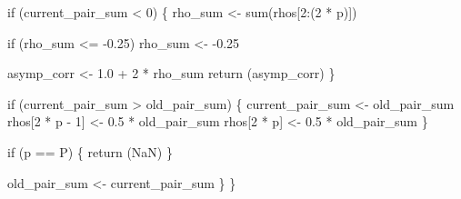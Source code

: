 \documentclass[
  letterpaper,
  DIV=11,
  numbers=noendperiod]{scrartcl}
\newenvironment{Shaded}{\begin{snugshade}}{\end{snugshade}}
\newcommand{\BuiltInTok}[1]{\textcolor[rgb]{0.00,0.23,0.31}{#1}}
\newcommand{\ControlFlowTok}[1]{\textcolor[rgb]{0.00,0.23,0.31}{#1}}
\newcommand{\DecValTok}[1]{\textcolor[rgb]{0.68,0.00,0.00}{#1}}
\newcommand{\FloatTok}[1]{\textcolor[rgb]{0.68,0.00,0.00}{#1}}
\newcommand{\NormalTok}[1]{\textcolor[rgb]{0.00,0.23,0.31}{#1}}
\newcommand{\OperatorTok}[1]{\textcolor[rgb]{0.37,0.37,0.37}{#1}}
\begin{document}
\begin{Shaded}
\begin{Highlighting}[]
    \ControlFlowTok{if}\NormalTok{ (current\_pair\_sum }\OperatorTok{\textless{}} \DecValTok{0}\NormalTok{) \{}
\NormalTok{      rho\_sum }\OperatorTok{\textless{}{-}} \BuiltInTok{sum}\NormalTok{(rhos[}\DecValTok{2}\NormalTok{:(}\DecValTok{2} \OperatorTok{*}\NormalTok{ p)])}
    
      \ControlFlowTok{if}\NormalTok{ (rho\_sum }\OperatorTok{\textless{}=} \OperatorTok{{-}}\FloatTok{0.25}\NormalTok{)}
\NormalTok{        rho\_sum }\OperatorTok{\textless{}{-}} \OperatorTok{{-}}\FloatTok{0.25}
    
\NormalTok{      asymp\_corr }\OperatorTok{\textless{}{-}} \FloatTok{1.0} \OperatorTok{+} \DecValTok{2} \OperatorTok{*}\NormalTok{ rho\_sum}
      \ControlFlowTok{return}\NormalTok{ (asymp\_corr)}
\NormalTok{    \}}
  
    \ControlFlowTok{if}\NormalTok{ (current\_pair\_sum }\OperatorTok{\textgreater{}}\NormalTok{ old\_pair\_sum) \{}
\NormalTok{      current\_pair\_sum }\OperatorTok{\textless{}{-}}\NormalTok{ old\_pair\_sum}
\NormalTok{      rhos[}\DecValTok{2} \OperatorTok{*}\NormalTok{ p }\OperatorTok{{-}} \DecValTok{1}\NormalTok{] }\OperatorTok{\textless{}{-}} \FloatTok{0.5} \OperatorTok{*}\NormalTok{ old\_pair\_sum}
\NormalTok{      rhos[}\DecValTok{2} \OperatorTok{*}\NormalTok{ p] }\OperatorTok{\textless{}{-}} \FloatTok{0.5} \OperatorTok{*}\NormalTok{ old\_pair\_sum}
\NormalTok{    \}}
  
    \ControlFlowTok{if}\NormalTok{ (p }\OperatorTok{==}\NormalTok{ P) \{}
      \ControlFlowTok{return}\NormalTok{ (NaN)}
\NormalTok{    \}}
  
\NormalTok{    old\_pair\_sum }\OperatorTok{\textless{}{-}}\NormalTok{ current\_pair\_sum}
\NormalTok{  \}}
\NormalTok{\}}
\end{Highlighting}
\end{Shaded}
\end{document}
